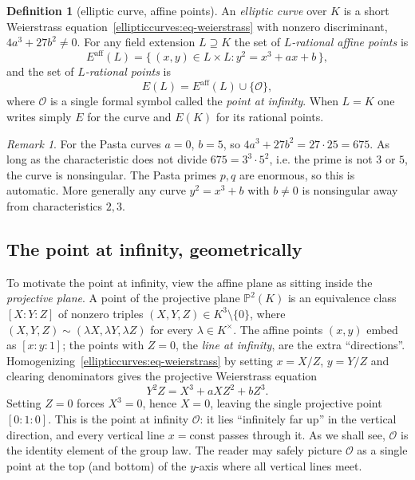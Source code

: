 \documentclass[11pt,a4paper]{article}
\theoremstyle{definition}
\newtheorem{definition}[theorem]{Definition}
\theoremstyle{remark}
\newtheorem{remark}[theorem]{Remark}
\begin{document}
\begin{definition}[elliptic curve, affine points]\label{ellipticcurves:def-curve}
An \emph{elliptic curve} over \(K\) is a short Weierstrass equation~\eqref{ellipticcurves:eq-weierstrass} with nonzero discriminant, \(4a^3 + 27 b^2 \neq 0\). For any field extension \(L \supseteq K\) the set of \emph{\(L\)-rational affine points} is
\[
  E^{\mathrm{aff}}(L) = \{\, (x,y) \in L \times L : y^2 = x^3 + ax + b \,\} ,
\]
and the set of \emph{\(L\)-rational points} is
\[
  E(L) = E^{\mathrm{aff}}(L) \cup \{\mathcal{O}\},
\]
where \(\mathcal{O}\) is a single formal symbol called the \emph{point at infinity}. When \(L = K\) one writes simply \(E\) for the curve and \(E(K)\) for its rational points.
\end{definition}

\begin{remark}\label{ellipticcurves:rem-pasta-smooth}
For the Pasta curves \(a = 0\), \(b = 5\), so \(4a^3 + 27 b^2 = 27 \cdot 25 = 675\). As long as the characteristic does not divide \(675 = 3^3 \cdot 5^2\), i.e. the prime is not \(3\) or \(5\), the curve is nonsingular. The Pasta primes \(p, q\) are enormous, so this is automatic. More generally any curve \(y^2 = x^3 + b\) with \(b \neq 0\) is nonsingular away from characteristics \(2, 3\).
\end{remark}

\subsection{The point at infinity, geometrically}

To motivate the point at infinity, view the affine plane as sitting inside the \emph{projective plane}. A point of the projective plane \(\mathbb{P}^2(K)\) is an equivalence class \([X : Y : Z]\) of nonzero triples \((X, Y, Z) \in K^3 \setminus \{0\}\), where \((X,Y,Z) \sim (\lambda X, \lambda Y, \lambda Z)\) for every \(\lambda \in K^{\times}\). The affine points \((x, y)\) embed as \([x : y : 1]\); the points with \(Z = 0\), the \emph{line at infinity}, are the extra ``directions''. Homogenizing~\eqref{ellipticcurves:eq-weierstrass} by setting \(x = X/Z\), \(y = Y/Z\) and clearing denominators gives the projective Weierstrass equation
\begin{equation}\label{ellipticcurves:eq-projective}
  Y^2 Z = X^3 + a X Z^2 + b Z^3 .
\end{equation}
Setting \(Z = 0\) forces \(X^3 = 0\), hence \(X = 0\), leaving the single projective point \([0 : 1 : 0]\). This is the point at infinity \(\mathcal{O}\): it lies ``infinitely far up'' in the vertical direction, and every vertical line \(x = \text{const}\) passes through it. As we shall see, \(\mathcal{O}\) is the identity element of the group law. The reader may safely picture \(\mathcal{O}\) as a single point at the top (and bottom) of the \(y\)-axis where all vertical lines meet.
\end{document}
